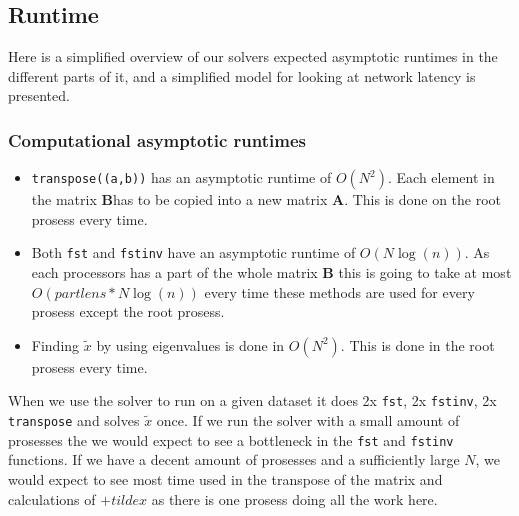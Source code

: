 
\subsection{Runtime} %

\label{sub:runtime}
Here is a simplified overview of our solvers expected asymptotic runtimes in the different parts of it, and a simplified model for looking at network latency is presented.

\subsubsection{Computational asymptotic runtimes} %
\label{ssub:asymptotic_runtimes}

\begin{itemize}

	\item \texttt{transpose((a,b))} has an asymptotic runtime of $O(N^2)$. Each element in the matrix \textbf{B}has to be copied into a new matrix \textbf{A}. This is done on the root prosess every time.
	
	\item Both \texttt{fst} and \texttt{fstinv} have an asymptotic runtime of $O(N\log(n))$. As each processors has a part of the whole matrix \textbf{B} this is going to take at most $O(partlens * N\log(n))$ every time these methods are used for every prosess except the root prosess. 
	
	\item Finding $\tilde{x}$ by using eigenvalues is done in $O(N^2)$. This is done in the root prosess every time. 

\end{itemize}

When we use the solver to run on a given dataset it does 2x \texttt{fst}, 2x \texttt{fstinv}, 2x \texttt{transpose} and solves $\tilde{x}$ once. If we run the solver with a small amount of prosesses the we would expect to see a bottleneck in the \texttt{fst} and \texttt{fstinv} functions. If we have a decent amount of prosesses and a sufficiently large $N$, we would expect to see most time used in the transpose of the matrix and calculations of $+tilde{x}$ as there is one prosess doing all the work here. 







